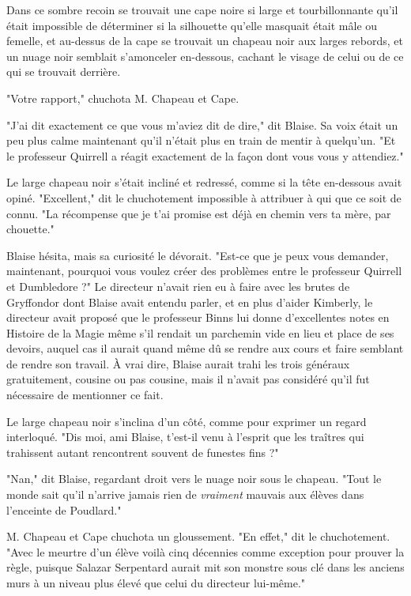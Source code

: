 Dans ce sombre recoin se trouvait une cape noire si large et tourbillonnante qu'il était impossible de déterminer si la silhouette qu'elle masquait était mâle ou femelle, et au-dessus de la cape se trouvait un chapeau noir aux larges rebords, et un nuage noir semblait s'amonceler en-dessous, cachant le visage de celui ou de ce qui se trouvait derrière.

"Votre rapport," chuchota M. Chapeau et Cape.

"J'ai dit exactement ce que vous m'aviez dit de dire," dit Blaise. Sa voix était un peu plus calme maintenant qu'il n'était plus en train de mentir à quelqu'un. "Et le professeur Quirrell a réagit exactement de la façon dont vous vous y attendiez."

Le large chapeau noir s'était incliné et redressé, comme si la tête en-dessous avait opiné. "Excellent," dit le chuchotement impossible à attribuer à qui que ce soit de connu. "La récompense que je t'ai promise est déjà en chemin vers ta mère, par chouette."

Blaise hésita, mais sa curiosité le dévorait. "Est-ce que je peux vous demander, maintenant, pourquoi vous voulez créer des problèmes entre le professeur Quirrell et Dumbledore ?" Le directeur n'avait rien eu à faire avec les brutes de Gryffondor dont Blaise avait entendu parler, et en plus d'aider Kimberly, le directeur avait proposé que le professeur Binns lui donne d'excellentes notes en Histoire de la Magie même s'il rendait un parchemin vide en lieu et place de ses devoirs, auquel cas il aurait quand même dû se rendre aux cours et faire semblant de rendre son travail. À vrai dire, Blaise aurait trahi les trois généraux gratuitement, cousine ou pas cousine, mais il n'avait pas considéré qu'il fut nécessaire de mentionner ce fait.

Le large chapeau noir s'inclina d'un côté, comme pour exprimer un regard interloqué. "Dis moi, ami Blaise, t'est-il venu à l'esprit que les traîtres qui trahissent autant rencontrent souvent de funestes fins ?"

"Nan," dit Blaise, regardant droit vers le nuage noir sous le chapeau. "Tout le monde sait qu'il n'arrive jamais rien de \emph{vraiment}  mauvais aux élèves dans l'enceinte de Poudlard."

M. Chapeau et Cape chuchota un gloussement. "En effet," dit le chuchotement. "Avec le meurtre d'un élève voilà cinq décennies comme exception pour prouver la règle, puisque Salazar Serpentard aurait mit son monstre sous clé dans les anciens murs à un niveau plus élevé que celui du directeur lui-même."

